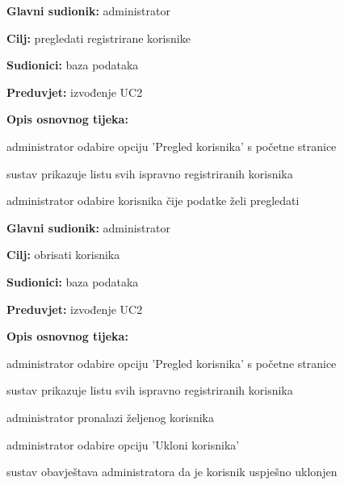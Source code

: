                     
                    \noindent {}
					\begin{packed_item}
	
						\item \textbf{Glavni sudionik: }administrator
						\item  \textbf{Cilj:} pregledati registrirane korisnike
						\item  \textbf{Sudionici:} baza podataka
						\item  \textbf{Preduvjet:} izvođenje UC2
						\item  \textbf{Opis osnovnog tijeka:}
						
						\item[] \begin{packed_enum}
	
							\item administrator odabire opciju 'Pregled korisnika' s početne stranice
							\item sustav prikazuje listu svih ispravno registriranih korisnika
							\item administrator odabire korisnika čije podatke želi pregledati

						\end{packed_enum}
					\end{packed_item}

                    \noindent {}
					\begin{packed_item}
	
						\item \textbf{Glavni sudionik: }administrator
						\item  \textbf{Cilj:} obrisati korisnika
						\item  \textbf{Sudionici:} baza podataka
						\item  \textbf{Preduvjet:} izvođenje UC2
						\item  \textbf{Opis osnovnog tijeka:}
						
						\item[] \begin{packed_enum}
							\item administrator odabire opciju 'Pregled korisnika' s početne stranice
							\item sustav prikazuje listu svih ispravno registriranih korisnika
							\item administrator pronalazi željenog korisnika
							\item administrator odabire opciju 'Ukloni korisnika'
							\item sustav obavještava administratora da je korisnik uspješno uklonjen
                            

						\end{packed_enum}
					\end{packed_item}

